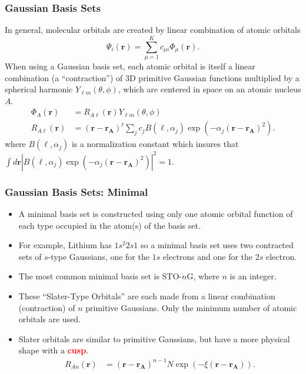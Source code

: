 \documentclass{beamer}
\newenvironment{noheadline}{
	\setbeamertemplate{headline}{}
	\addtobeamertemplate{frametitle}{\vspace*{-0.9\baselineskip}}{}
}{}
\newcommand{\insertcurrentcitation}{}
\newcommand{\currentcitation}[1]{
	\renewcommand{\insertcurrentcitation}{#1}
} %
\newcommand{\bb}[1]{\textcolor{red}{\textbf{#1}}}
\begin{document}
\begin{noheadline}
\currentcitation{}
\begin{frame}
\frametitle{Gaussian Basis Sets}
In general, molecular orbitals are created by linear combination of atomic orbitals
\begin{equation*}
\Psi _ { i } ( \mathbf { r } ) = \sum _ { \mu = 1 } ^ { K } c _ { \mu i } \Phi_ { \mu } ( \mathbf { r } ) .
\end{equation*}
When using a Gaussian basis set, each atomic orbital is itself a linear combination (a ``contraction'') of 3D primitive Gaussian functions multiplied by a spherical harmonic $Y _ { \ell m } ( \theta , \phi )$, which are centered in space on an atomic nucleus $A$.
\begin{align*}
\Phi_{A} ( \mathbf { r } ) &= R _ { A\ell } ( \mathbf { r } ) Y _ { \ell m } ( \theta , \phi )\\
R _ { A\ell } ( \mathbf { r } ) &= (\mathbf{r} - \mathbf{r_{A}}) ^ { \ell } \sum _ { j } c _ { j } B \left( \ell , \alpha _ { j } \right) \exp \left( - \alpha _ { j } (\mathbf { r } - \mathbf { r_{A} }) ^ { 2 } \right).
\end{align*}
where $B \left( \ell , \alpha _ { j } \right)$ is a normalization constant which insures that $\int d\mathbf { r } \left| B \left( \ell , \alpha _ { j } \right) \exp \left( - \alpha _ { j } (\mathbf { r } - \mathbf { r_{A} }) ^ { 2 } \right) \right| ^ { 2 } = 1$.
\end{frame}

\begin{frame}
\frametitle{Gaussian Basis Sets: Minimal}
\begin{itemize}
\item A minimal basis set is constructed using only one atomic orbital function of each type occupied in the atom(s) of the basis set. 
\item For example, Lithium has $1s^{2}2s{1}$ so a minimal basis set uses two contracted sets of $s$-type Gaussians, one for the $1s$ electrons and one for the $2s$ electron.
\item The most common minimal basis set is STO-$n$G, where $n$ is an integer. 
\item These ``Slater-Type Orbitals'' are each made from a linear combination (contraction) of $n$ primitive Gaussians. Only the minimum number of atomic orbitals are used.
\item Slater orbitals are similar to primitive Gaussians, but have a more physical shape with a \bb{cusp}.
\begin{align*}
R _ { A n} ( \mathbf { r } ) &= (\mathbf { r } - \mathbf { r_{A} }) ^ { n - 1 } N \exp \left( - \xi (\mathbf { r } - \mathbf { r_{A} }) \right).
\end{align*}
\end{itemize}
\end{frame}


\end{noheadline}
\end{document}
